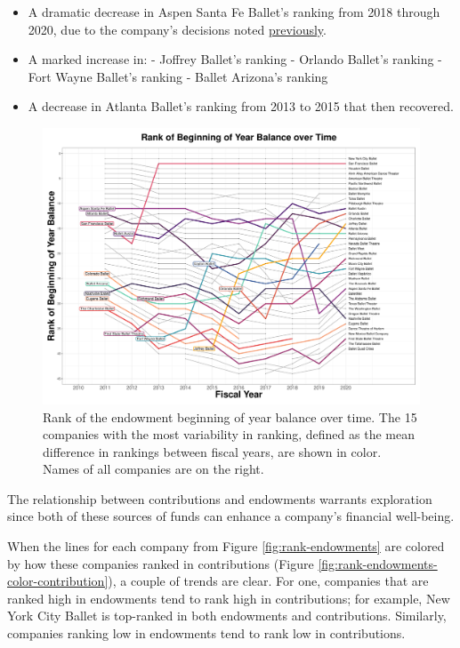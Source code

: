 \documentclass[Dance Data
Project,article,submit,moreauthors,pdftex]{mdpi}
\begin{document}
\begin{itemize}
\item A dramatic decrease in Aspen Santa Fe Ballet’s ranking from 2018 through 2020, due to the company’s decisions noted  \hyperref[sec:asfb]{previously}.
\item A marked increase in: 
\subitem - Joffrey Ballet’s ranking
\subitem - Orlando Ballet’s ranking
\subitem - Fort Wayne Ballet’s ranking
\subitem - Ballet Arizona’s ranking
\item A decrease in Atlanta Ballet’s ranking from 2013 to 2015 that then recovered.
\end{itemize}

\begin{figure}[H]
\includegraphics[width=0.9\linewidth,]{../images/rank_of_beginning_year_balance} \caption{\label{fig:rank-endowments}Rank of the endowment beginning of year balance over time. The 15 companies with the most variability in ranking, defined as the mean difference in rankings between fiscal years, are shown in color. Names of all companies are on the right.}\label{fig:rank-og-beginning-year-balance}
\end{figure}

The relationship between contributions and endowments warrants
exploration since both of these sources of funds can enhance a company's
financial well-being.

When the lines for each company from Figure \ref{fig:rank-endowments}
are colored by how these companies ranked in contributions (Figure
\ref{fig:rank-endowments-color-contribution}), a couple of trends are
clear. For one, companies that are ranked high in endowments tend to
rank high in contributions; for example, New York City Ballet is
top-ranked in both endowments and contributions. Similarly, companies
ranking low in endowments tend to rank low in contributions.
\end{document}
